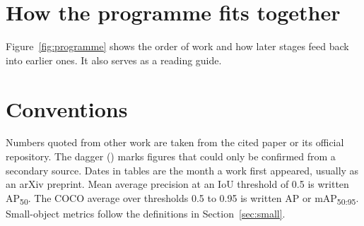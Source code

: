 \section{How the programme fits together}

Figure~\ref{fig:programme} shows the order of work and how later stages feed
back into earlier ones. It also serves as a reading guide.



\section{Conventions}

Numbers quoted from other work are taken from the cited paper or its official
repository. The dagger (\unv) marks figures that could only be confirmed from
a secondary source. Dates in tables are the month a work first appeared,
usually as an arXiv preprint. Mean average precision at an IoU threshold of
0.5 is written AP\textsubscript{50}. The COCO average over thresholds 0.5 to
0.95 is written AP or mAP\textsubscript{50:95}. Small-object metrics follow
the definitions in Section~\ref{sec:small}.
